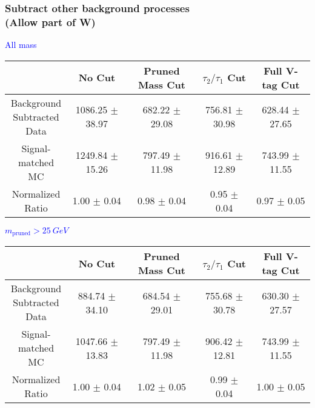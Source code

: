 \documentclass{beamer}
\begin{document}
\begin{frame}
  \frametitle{Subtract other background processes \\ (Allow part of W)}
  \begin{adjustwidth}{-1.5em}{-1.5em}
    \centering
    \vspace{6pt}
    \textcolor{blue}{All mass}
    \vspace{6pt}

    {\scriptsize
      \begin{tabular}{c | c | c | c | c}
        \hline
        & No Cut & Pruned Mass Cut & $\tau_2/\tau_1$ Cut & Full V-tag Cut \\
        \hline
        \makecell{Background \\ Subtracted \\ Data} & 1086.25 $\pm$ 38.97 & 682.22 $\pm$ 29.08 & 756.81 $\pm$ 30.98 & 628.44 $\pm$ 27.65 \\
        \makecell{Signal-\\ matched MC} & 1249.84 $\pm$ 15.26 & 797.49 $\pm$ 11.98 & 916.61 $\pm$ 12.89 & 743.99 $\pm$ 11.55 \\
        \hline
        \makecell{Normalized \\ Ratio} & 1.00 $\pm$ 0.04 & 0.98 $\pm$ 0.04 & 0.95 $\pm$ 0.04 & 0.97 $\pm$ 0.05 \\
        \hline
      \end{tabular}
    }

    \vspace{6pt}
    \textcolor{blue}{$m_\text{pruned} > \SI{25}{GeV}$}
    \vspace{6pt}

    {\scriptsize
      \begin{tabular}{c | c | c | c | c}
        \hline
        & No Cut & Pruned Mass Cut & $\tau_2/\tau_1$ Cut & Full V-tag Cut \\
        \hline
        \makecell{Background \\ Subtracted \\ Data} & 884.74 $\pm$ 34.10 & 684.54 $\pm$ 29.01 & 755.68 $\pm$ 30.78 & 630.30 $\pm$ 27.57 \\
        \makecell{Signal-\\ matched MC} & 1047.66 $\pm$ 13.83 & 797.49 $\pm$ 11.98 & 906.42 $\pm$ 12.81 & 743.99 $\pm$ 11.55 \\
        \hline
        \makecell{Normalized \\ Ratio} & 1.00 $\pm$ 0.04 & 1.02 $\pm$ 0.05 & 0.99 $\pm$ 0.04 & 1.00 $\pm$ 0.05 \\
        \hline
      \end{tabular}
    }
  \end{adjustwidth}
\end{frame}
\end{document}
